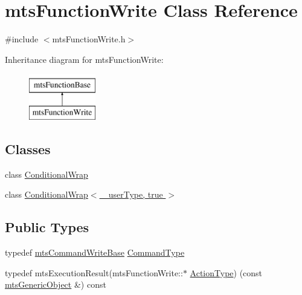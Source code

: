 \hypertarget{classmts_function_write}{}\section{mts\+Function\+Write Class Reference}
\label{classmts_function_write}


{\ttfamily \#include $<$mts\+Function\+Write.\+h$>$}

Inheritance diagram for mts\+Function\+Write\+:\begin{figure}[H]
\begin{center}
\leavevmode
\includegraphics[height=2.000000cm]{d7/dc3/classmts_function_write}
\end{center}
\end{figure}
\subsection*{Classes}
\begin{DoxyCompactItemize}
\item 
class \hyperlink{classmts_function_write_1_1_conditional_wrap}{Conditional\+Wrap}
\item 
class \hyperlink{classmts_function_write_1_1_conditional_wrap_3_01__user_type_00_01true_01_4}{Conditional\+Wrap$<$ \+\_\+user\+Type, true $>$}
\end{DoxyCompactItemize}
\subsection*{Public Types}
\begin{DoxyCompactItemize}
\item 
typedef \hyperlink{classmts_command_write_base}{mts\+Command\+Write\+Base} \hyperlink{classmts_function_write_a4b81286be87adec18b358ebaa9ebb2be}{Command\+Type}
\item 
typedef mts\+Execution\+Result(mts\+Function\+Write\+::$\ast$ \hyperlink{classmts_function_write_acdce6b414e90dfb8c05bab5e7a2db81b}{Action\+Type}) (const \hyperlink{classmts_generic_object}{mts\+Generic\+Object} \&) const 
\end{DoxyCompactItemize}
